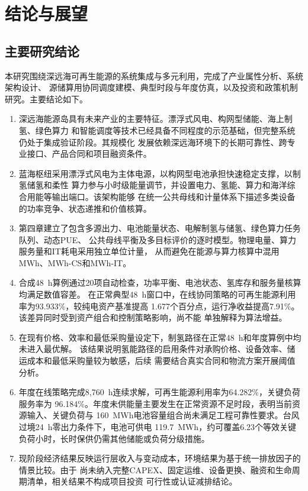 \chapter{结论与展望}

\section{主要研究结论}

本研究围绕深远海可再生能源的系统集成与多元利用，完成了产业属性分析、系统架构设计、
源储算用协同调度建模、典型时段与年度仿真，以及投资和政策机制研究。主要结论如下。

\begin{enumerate}[label=(\arabic*)]
  \item 深远海能源岛具有未来产业的主要特征。漂浮式风电、构网型储能、海上制氢、绿色算力
        和智能调度等技术已经具备不同程度的示范基础，但完整系统仍处于集成验证阶段。其规模化
        发展依赖深远海环境下的长期可靠性、跨专业接口、产品合同和项目融资条件。
  \item 蓝海枢纽采用漂浮式风电为主体电源，以构网型电池承担快速稳定支撑，以制氢储氢和柔性
        算力参与小时级能量调节，并设置电力、氢能、算力和海洋综合用能等输出端口。该架构能够
        在统一公共母线和计量体系下描述多类设备的功率竞争、状态递推和价值核算。
  \item 第四章建立了包含多源出力、电池能量状态、电解制氢与储氢、绿色算力任务队列、动态PUE、
        公共母线平衡及多目标评价的逐时模型。物理电量、算力服务量和IT耗电采用独立单位计量，
        从而避免在能源与算力核算中混用MWh、MWh-CS和MWh-IT。
  \item 合成48~h算例通过20项自动检查，功率平衡、电池状态、氢库存和服务量核算均满足数值容差。
        在正常典型48~h窗口中，在线协同策略的可再生能源利用率为93.933\%，较纯电资产基准提高
        1.677个百分点，运行净收益提高7.91\%。该差异同时受到资产组合和控制策略影响，尚不能
        单独解释为算法增益。
  \item 在现有价格、效率和最低采购量设定下，制氢路径在正常48~h和年度算例中均未进入最优解。
        该结果说明氢能路径的启用条件对承购价格、设备效率、储运成本和最低采购量较为敏感，后续
        需要结合真实合同和物流方案开展阈值分析。
  \item 年度在线策略完成8,760~h连续求解，可再生能源利用率为64.282\%，关键负荷服务率为
        96.184\%。年度未供能量主要发生在正常资源不足时段，表明当前资源输入、关键负荷与
        160~MWh电池容量组合尚未满足工程可靠性要求。台风过境24~h零出力条件下，电池可供电
        119.7~MWh，约可覆盖6.23个等效关键负荷小时，长时保供仍需其他储能或负荷分级措施。
  \item 现阶段经济结果反映运行层收入与变动成本，环境结果为基于统一排放因子的情景比较。由于
        尚未纳入完整CAPEX、固定运维、设备更换、融资和生命周期清单，相关结果不构成项目投资
        可行性或认证减排结论。
\end{enumerate}

